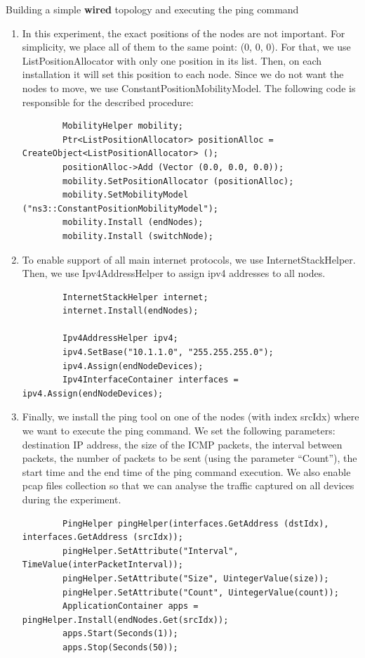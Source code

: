 \begin{exercise}{Building a simple \textbf{wired} topology and executing the ping command}
\begin{enumerate}
\begin{lstlisting}
		BridgeHelper bridge;
		bridge.Install(switchNode.Get (0), switchDevices);
		\end{lstlisting}
		
				
		\item In this experiment, the exact positions of the nodes are not important. For simplicity, we place all of them to the same point: (0, 0, 0). For that, we use ListPositionAllocator with only one position in its list. Then, on each installation it will set this position to each node. Since we do not want the nodes to move, we use ConstantPositionMobilityModel. The following code is responsible for the described procedure:
		\begin{lstlisting}
		MobilityHelper mobility;
		Ptr<ListPositionAllocator> positionAlloc = CreateObject<ListPositionAllocator> ();
		positionAlloc->Add (Vector (0.0, 0.0, 0.0));
		mobility.SetPositionAllocator (positionAlloc);
		mobility.SetMobilityModel ("ns3::ConstantPositionMobilityModel");
		mobility.Install (endNodes);
		mobility.Install (switchNode);
		\end{lstlisting}
		
		\item To enable support of all main internet protocols, we use InternetStackHelper. Then, we use Ipv4AddressHelper to assign \ac{ipv4} addresses to all nodes.
		\begin{lstlisting}
		InternetStackHelper internet;
		internet.Install(endNodes);
		
		Ipv4AddressHelper ipv4;
		ipv4.SetBase("10.1.1.0", "255.255.255.0");
		ipv4.Assign(endNodeDevices);
		Ipv4InterfaceContainer interfaces = ipv4.Assign(endNodeDevices);
		\end{lstlisting}
		
		\item Finally, we install the ping tool on one of the nodes (with index srcIdx) where we want to execute the ping command. We set the following parameters: destination IP address, the size of the ICMP packets, the interval between packets, the number of packets to be sent (using the parameter ``Count''), the start time and the end time of the ping command execution. We also enable pcap files collection so that we can analyse the traffic captured on all devices during the experiment.
		\begin{lstlisting}
		PingHelper pingHelper(interfaces.GetAddress (dstIdx), interfaces.GetAddress (srcIdx));
		pingHelper.SetAttribute("Interval", TimeValue(interPacketInterval));
		pingHelper.SetAttribute("Size", UintegerValue(size));
		pingHelper.SetAttribute("Count", UintegerValue(count));
		ApplicationContainer apps = pingHelper.Install(endNodes.Get(srcIdx));
		apps.Start(Seconds(1));
		apps.Stop(Seconds(50));
		

\end{lstlisting}
\end{enumerate}
\end{exercise}

